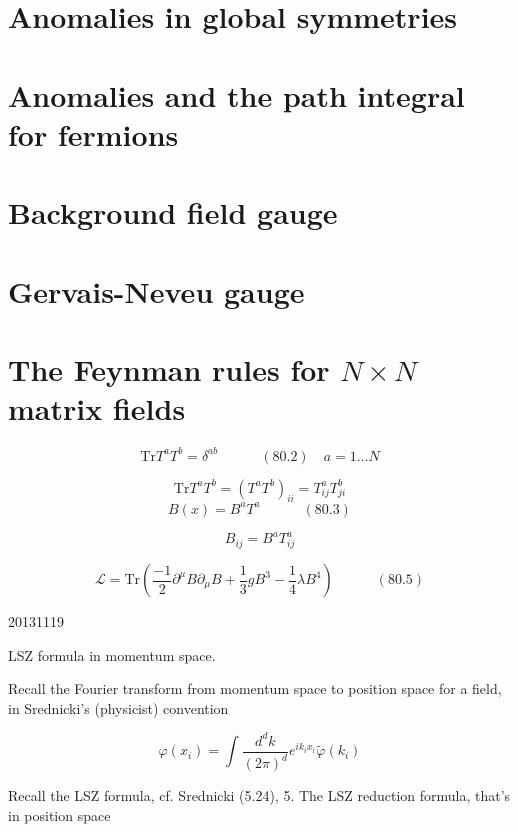 \documentclass[twoside]{amsart}
\begin{document}
\section{ Anomalies in global symmetries}

\section{ Anomalies and the path integral for fermions}

\section{ Background field gauge }

\section{ Gervais-Neveu gauge}

\section{ The Feynman rules for $N \times N$ matrix fields}

\begin{equation}
  \text{Tr}{ T^a T^b} = \delta^{ab} \quad \quad \quad (80.2) \quad a = 1 \dots N 
\end{equation}

\[
\text{Tr}{ T^a T^b} = (T^a T^b)_{ii} = T_{ij}^a T_{ji}^b
\]
\begin{equation}
B(x) = B^a T^a \quad \quad \quad (80.3) 
\end{equation}

\[
B_{ij} = B^a T_{ij}^a
\]

\begin{equation}
  \mathcal{L} = \text{Tr}{ ( \frac{-1}{2} \partial^{\mu} B \partial_{\mu} B + \frac{1}{3} g B^3  - \frac{1}{4} \lambda B^4) } \quad \quad \quad (80.5)
\end{equation}


20131119

LSZ formula in momentum space.  

Recall the Fourier transform from momentum space to position space for a field, in Srednicki's (physicist) convention

\[
\varphi(x_i) = \int \frac{d^d k}{ (2\pi)^d } e^{ik_i x_i } \widetilde{\varphi}(k_i)
\]

Recall the LSZ formula, cf. Srednicki (5.24), 5. The LSZ reduction formula, that's in position space
\end{document}
